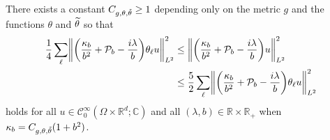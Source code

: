 \documentclass[10pt]{amsart}
\theoremstyle{definition}\newtheorem{defi}[theo]{Definition}\newtheorem{rema}[theo]{Remark}\newtheorem{exam}[theo]{Example}\newtheorem{exem}[theo]{Example}\newtheorem{nota}[theo]{Notation}
\newcommand{\C}{\mathbb{C}}
\newcommand{\R}{\mathbb{R}}
\newcommand{\clC}{\mathcal{C}}
\newcommand{\clP}{\mathcal{P}}
\newcommand\norm[1]{\left\lVert#1\right\rVert}
\let\oldtilde\tilde
\renewcommand*{\tilde}[1]{\mathchoice{\widetilde{#1}}{\widetilde{#1}}{\oldtilde{#1}}{\oldtilde{#1}}}
\let\originalleft\left
\let\originalright\right
\renewcommand{\left}{\mathopen{}\mathclose\bgroup\originalleft}
\renewcommand{\right}{\aftergroup\egroup\originalright}
\begin{document}
\begin{prop}\label{pr:equivNormAfterDyadicPartition}
There exists a constant $C_{g,\theta, \tilde{\theta}}\geq 1$ depending only on the metric $g$ and the functions $\theta$ and $\tilde{\theta}$ so that
\begin{equation}
\label{eq:EquivDyadicPartition}
\begin{aligned}[t]
\frac{1}{4} \sum_{\ell} \norm{\left(\frac{\kappa_{b}}{b^{2}}+\clP_{b}-\frac{i\lambda}{b} \right) \theta_{\ell} u}_{L^2}^{2}
&\leq \norm{\left(\frac{\kappa_{b}}{b^{2}}+\clP_{b}-\frac{i\lambda}{b}\right) u}^{2}_{L^2}
\\
&\leq \frac{5}{2}\sum_{\ell} \norm{\left(\frac{\kappa_{b}}{b^{2}}+\clP_{b}-\frac{i\lambda}{b}\right) \theta_{\ell} u}^{2}_{L^2}
\end{aligned}
\end{equation}
holds for all $u\in \clC^\infty_0(\Omega\times\R^d;\C)$ and all $(\lambda,b)\in \R\times \R_+$ when $\kappa_b = C_{g,\theta, \tilde{\theta}}(1+b^2)$.
\end{prop}
\end{document}
